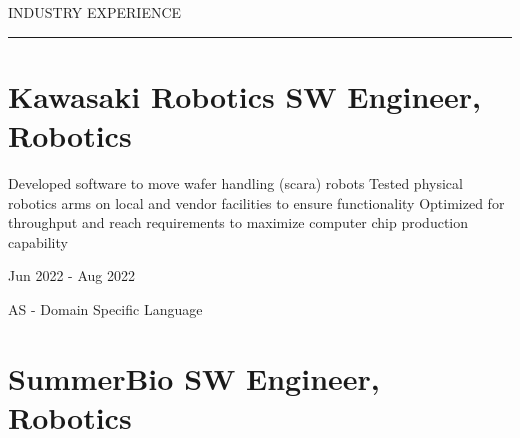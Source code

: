 
\vspace{1ex}

{\hspace{-1.72in}\noindent\color{cblue} INDUSTRY EXPERIENCE }

\vspace{5ex}

\vspace{-6.5ex}
{\hspace{-1.73in}\noindent\color{dblue}\rule{6.935in}{0.4pt}} %
\vspace{-3.4ex}


\section
{\textbf{Kawasaki Robotics} \newline
SW Engineer, Robotics}{}

\vspace{-2.0ex}
\begin{detail}
    \BulletItem
    Developed software to move wafer handling (scara) robots 
    \BulletItem
    Tested physical robotics arms on local and vendor facilities to ensure functionality
    \BulletItem
    Optimized for throughput and reach requirements to maximize computer chip production capability
\end{detail}

\begin{subtitle}
    \vspace{-10.5ex}
    {{Jun 2022 - Aug 2022}}
\end{subtitle}

{\vspace{3ex} \color{cyan}\small {AS - Domain Specific Language}}
\vspace{1ex}


\section
{\textbf{SummerBio} \newline
SW Engineer, Robotics}{}

